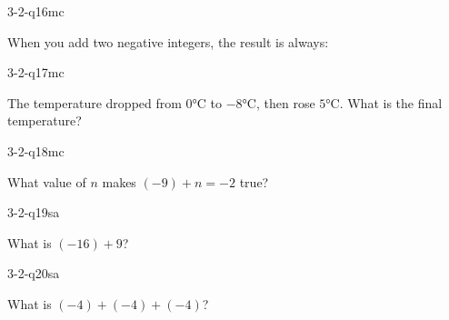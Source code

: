 \begin{practiceQuestion}{3-2-q16}{mc}
\begin{questionText}
When you add two negative integers, the result is always:
\end{questionText}
\end{practiceQuestion}

\begin{practiceQuestion}{3-2-q17}{mc}
\begin{questionText}
The temperature dropped from $0°$C to $-8°$C, then rose $5°$C. What is the final temperature?
\end{questionText}
\end{practiceQuestion}

\begin{practiceQuestion}{3-2-q18}{mc}
\begin{questionText}
What value of $n$ makes $(-9) + n = -2$ true?
\end{questionText}
\end{practiceQuestion}


\begin{practiceQuestion}{3-2-q19}{sa}
\begin{questionText}
What is $(-16) + 9$?
\end{questionText}
\end{practiceQuestion}

\begin{practiceQuestion}{3-2-q20}{sa}
\begin{questionText}
What is $(-4) + (-4) + (-4)$?
\end{questionText}
\end{practiceQuestion}

